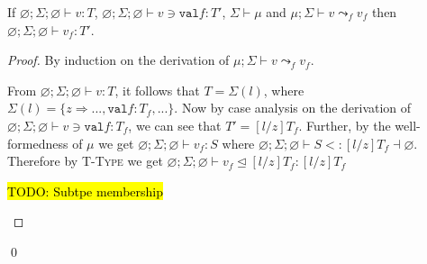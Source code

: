 \documentclass{llncs}
\numberwithin{subcase}{casethm}
\numberwithin{casethm}{theorem}
\numberwithin{casethm}{lemma}
\begin{document}
\begin{lemma} \label{lem:field_leadsto_preservation}
If $\varnothing; \Sigma; \varnothing \vdash v : T$,
$\varnothing; \Sigma; \varnothing \vdash v \ni \texttt{val} f : T'$, 
$\Sigma \vdash  \mu$ and $\mu; \Sigma \vdash v \leadsto_f v_f$ then 
$\varnothing; \Sigma; \varnothing \vdash v_f : T'$.
\end{lemma}
\begin{proof}
By induction on the derivation of $\mu; \Sigma \vdash v \leadsto_f v_f$.
\begin{casethm}
From $\varnothing; \Sigma; \varnothing \vdash v : T$, it follows that 
$T = \Sigma(l)$, where 
$\Sigma(l) = \{z \Rightarrow ..., \texttt{val} f : T_f, ...\}$. Now by 
case analysis on the derivation of 
$\varnothing; \Sigma; \varnothing \vdash v \ni \texttt{val} f : T_f$, we 
can see that $T' = [l/z]T_f$.
Further, by the well-formedness of $\mu$ we get
$\varnothing; \Sigma; \varnothing \vdash v_f : S$ where 
$\varnothing; \Sigma; \varnothing \vdash S <: [l/z]T_f \dashv \varnothing$. Therefore 
by \textsc{T-Type} we get $\varnothing; \Sigma; \varnothing \vdash v_f\unlhd [l/z]T_f : [l/z]T_f$
\end{casethm}
\begin{casethm}
\hl{TODO: Subtpe membership}
\end{casethm}
\end{proof}
\qed
\end{document}
